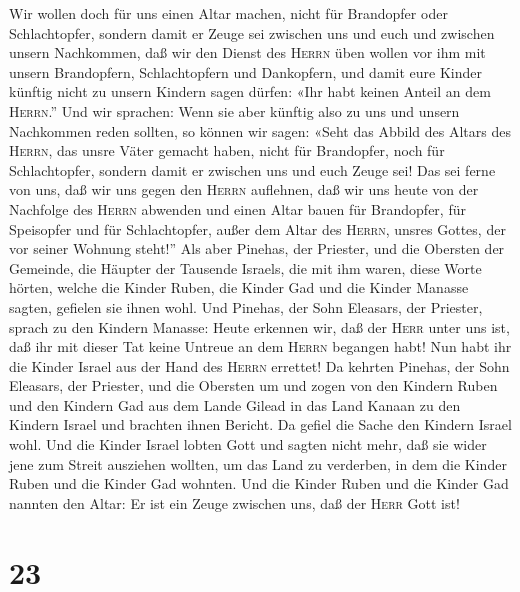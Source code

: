 Wir wollen doch für uns einen Altar machen, nicht für Brandopfer oder
Schlachtopfer,  sondern damit er Zeuge sei zwischen uns
und euch und zwischen unsern Nachkommen, daß wir den Dienst des
\textsc{Herrn} üben wollen vor ihm mit unsern Brandopfern,
Schlachtopfern und Dankopfern, und damit eure Kinder künftig nicht zu
unsern Kindern sagen dürfen: «Ihr habt keinen Anteil an dem
\textsc{Herrn}.''  Und wir sprachen: Wenn sie aber
künftig also zu uns und unsern Nachkommen reden sollten, so können wir
sagen: «Seht das Abbild des Altars des \textsc{Herrn}, das unsre Väter
gemacht haben, nicht für Brandopfer, noch für Schlachtopfer, sondern
damit er zwischen uns und euch Zeuge sei!  Das sei ferne
von uns, daß wir uns gegen den \textsc{Herrn} auflehnen, daß wir uns
heute von der Nachfolge des \textsc{Herrn} abwenden und einen Altar
bauen für Brandopfer, für Speisopfer und für Schlachtopfer, außer dem
Altar des \textsc{Herrn}, unsres Gottes, der vor seiner Wohnung steht!''
 Als aber Pinehas, der Priester, und die Obersten der
Gemeinde, die Häupter der Tausende Israels, die mit ihm waren, diese
Worte hörten, welche die Kinder Ruben, die Kinder Gad und die Kinder
Manasse sagten, gefielen sie ihnen wohl.  Und Pinehas,
der Sohn Eleasars, der Priester, sprach zu den Kindern Manasse: Heute
erkennen wir, daß der \textsc{Herr} unter uns ist, daß ihr mit dieser
Tat keine Untreue an dem \textsc{Herrn} begangen habt! Nun habt ihr die
Kinder Israel aus der Hand des \textsc{Herrn} errettet! 
Da kehrten Pinehas, der Sohn Eleasars, der Priester, und die Obersten um
und zogen von den Kindern Ruben und den Kindern Gad aus dem Lande Gilead
in das Land Kanaan zu den Kindern Israel und brachten ihnen Bericht.
 Da gefiel die Sache den Kindern Israel wohl. Und die
Kinder Israel lobten Gott und sagten nicht mehr, daß sie wider jene zum
Streit ausziehen wollten, um das Land zu verderben, in dem die Kinder
Ruben und die Kinder Gad wohnten.  Und die Kinder Ruben
und die Kinder Gad nannten den Altar: Er ist ein Zeuge zwischen uns, daß
der \textsc{Herr} Gott ist!

\hypertarget{section-22}{%
\section{23}\label{section-22}}


